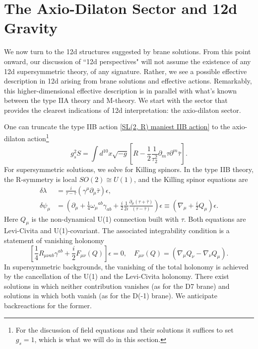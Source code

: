 \section{The Axio-Dilaton Sector and 12d Gravity}
We now turn to the 12d structures suggested by brane solutions.
From this point onward, our discussion of ``12d perspectives" will not assume the existence of any 12d supersymmetric theory, of any signature.
Rather, we see a possible effective description in 12d arising from brane solutions and effective actions.
Remarkably, this higher-dimensional effective description is in parallel with what's known between the type IIA theory and M-theory.
We start with the sector that provides the clearest indications of 12d interpretation: the axio-dilaton sector.

One can truncate the type IIB action \eqref{SL(2, R) maniest IIB action} to the axio-dilaton action\footnote{
For the discussion of field equations and their solutions it suffices to set $g_s=1$, which is what we will do in this section.
}
\begin{equation}
g_s^2S=
\int d^{10}x\sqrt{-g}\left[
R-\frac{1}{2}\frac{1}{\tau_2^2}\partial_m\tau\partial^m\bar\tau
\right].
\label{IIB axio-dilaton action}
\end{equation}
For supersymmetric solutions, we solve for Killing spinors.
In the type IIB theory, the R-symmetry is local $SO(2)\cong U(1)$, and the Killing spinor equations are \cite{Bergshoeff:2006jj}
\begin{equation}
\begin{aligned}
\delta\lambda
&=\frac{i}{\tau-\bar\tau}(\gamma^\mu\partial_\mu \bar\tau)\epsilon,\\
\delta\psi_\mu
&=
\left(
\partial_\mu+\frac{1}{4}\omega_\mu{}^{ab}\gamma_{ab} +\frac{i}{2}\frac{1}{2i}\frac{\partial_\mu(\tau+\bar\tau)}{(\tau-\bar\tau)}
\right)\epsilon
\equiv\left(\nabla_\mu+\frac{i}{2}Q_\mu\right)\epsilon.
\end{aligned}
\label{9+1 IIB axio-dilaton Killing spinor equations}
\end{equation}
Here $Q_\mu$ is the non-dynamical U(1) connection built with $\tau$. Both equations are Levi-Civita and U(1)-covariant.
The associated integrability condition is a statement of vanishing holonomy
\begin{equation}
\left[\frac{1}{4}R_{\mu\nu ab}\gamma^{ab}
+ \frac{i}{2}F_{\mu\nu}(Q)\right]
\epsilon = 0,\quad
F_{\mu\nu}(Q)=(\nabla_\mu Q_\nu-\nabla_\nu Q_\mu).
\end{equation}
In supersymmetric backgrounds, the vanishing of the total holonomy is achieved by the cancellation of the U(1) and the Levi-Civita holonomy. 
There exist solutions in which neither contribution vanishes (as for the D7 brane) and solutions in which both vanish (as for the D(-1) brane).
We anticipate backreactions for the former. 

